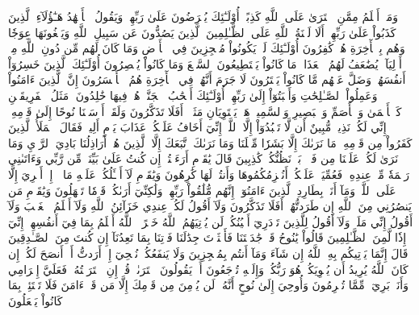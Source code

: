 وَمَنۡ أَظۡلَمُ مِمَّنِ ٱفۡتَرَىٰ عَلَى ٱللَّهِ كَذِبًاۚ أُوْلَـٰٓئِكَ يُعۡرَضُونَ عَلَىٰ رَبِّهِمۡ وَيَقُولُ ٱلۡأَشۡهَٰدُ هَـٰٓؤُلَآءِ ٱلَّذِينَ كَذَبُواْ عَلَىٰ رَبِّهِمۡۚ أَلَا لَعۡنَةُ ٱللَّهِ عَلَى ٱلظَّـٰلِمِينَ
ٱلَّذِينَ يَصُدُّونَ عَن سَبِيلِ ٱللَّهِ وَيَبۡغُونَهَا عِوَجٗا وَهُم بِٱلۡأٓخِرَةِ هُمۡ كَٰفِرُونَ
أُوْلَـٰٓئِكَ لَمۡ يَكُونُواْ مُعۡجِزِينَ فِي ٱلۡأَرۡضِ وَمَا كَانَ لَهُم مِّن دُونِ ٱللَّهِ مِنۡ أَوۡلِيَآءَۘ يُضَٰعَفُ لَهُمُ ٱلۡعَذَابُۚ مَا كَانُواْ يَسۡتَطِيعُونَ ٱلسَّمۡعَ وَمَا كَانُواْ يُبۡصِرُونَ
أُوْلَـٰٓئِكَ ٱلَّذِينَ خَسِرُوٓاْ أَنفُسَهُمۡ وَضَلَّ عَنۡهُم مَّا كَانُواْ يَفۡتَرُونَ
لَا جَرَمَ أَنَّهُمۡ فِي ٱلۡأٓخِرَةِ هُمُ ٱلۡأَخۡسَرُونَ
إِنَّ ٱلَّذِينَ ءَامَنُواْ وَعَمِلُواْ ٱلصَّـٰلِحَٰتِ وَأَخۡبَتُوٓاْ إِلَىٰ رَبِّهِمۡ أُوْلَـٰٓئِكَ أَصۡحَٰبُ ٱلۡجَنَّةِۖ هُمۡ فِيهَا خَٰلِدُونَ
۞مَثَلُ ٱلۡفَرِيقَيۡنِ كَٱلۡأَعۡمَىٰ وَٱلۡأَصَمِّ وَٱلۡبَصِيرِ وَٱلسَّمِيعِۚ هَلۡ يَسۡتَوِيَانِ مَثَلًاۚ أَفَلَا تَذَكَّرُونَ
وَلَقَدۡ أَرۡسَلۡنَا نُوحًا إِلَىٰ قَوۡمِهِۦٓ إِنِّي لَكُمۡ نَذِيرٞ مُّبِينٌ
أَن لَّا تَعۡبُدُوٓاْ إِلَّا ٱللَّهَۖ إِنِّيٓ أَخَافُ عَلَيۡكُمۡ عَذَابَ يَوۡمٍ أَلِيمٖ
فَقَالَ ٱلۡمَلَأُ ٱلَّذِينَ كَفَرُواْ مِن قَوۡمِهِۦ مَا نَرَىٰكَ إِلَّا بَشَرٗا مِّثۡلَنَا وَمَا نَرَىٰكَ ٱتَّبَعَكَ إِلَّا ٱلَّذِينَ هُمۡ أَرَاذِلُنَا بَادِيَ ٱلرَّأۡيِ وَمَا نَرَىٰ لَكُمۡ عَلَيۡنَا مِن فَضۡلِۭ بَلۡ نَظُنُّكُمۡ كَٰذِبِينَ
قَالَ يَٰقَوۡمِ أَرَءَيۡتُمۡ إِن كُنتُ عَلَىٰ بَيِّنَةٖ مِّن رَّبِّي وَءَاتَىٰنِي رَحۡمَةٗ مِّنۡ عِندِهِۦ فَعُمِّيَتۡ عَلَيۡكُمۡ أَنُلۡزِمُكُمُوهَا وَأَنتُمۡ لَهَا كَٰرِهُونَ
وَيَٰقَوۡمِ لَآ أَسۡـَٔلُكُمۡ عَلَيۡهِ مَالًاۖ إِنۡ أَجۡرِيَ إِلَّا عَلَى ٱللَّهِۚ وَمَآ أَنَا۠ بِطَارِدِ ٱلَّذِينَ ءَامَنُوٓاْۚ إِنَّهُم مُّلَٰقُواْ رَبِّهِمۡ وَلَٰكِنِّيٓ أَرَىٰكُمۡ قَوۡمٗا تَجۡهَلُونَ
وَيَٰقَوۡمِ مَن يَنصُرُنِي مِنَ ٱللَّهِ إِن طَرَدتُّهُمۡۚ أَفَلَا تَذَكَّرُونَ
وَلَآ أَقُولُ لَكُمۡ عِندِي خَزَآئِنُ ٱللَّهِ وَلَآ أَعۡلَمُ ٱلۡغَيۡبَ وَلَآ أَقُولُ إِنِّي مَلَكٞ وَلَآ أَقُولُ لِلَّذِينَ تَزۡدَرِيٓ أَعۡيُنُكُمۡ لَن يُؤۡتِيَهُمُ ٱللَّهُ خَيۡرًاۖ ٱللَّهُ أَعۡلَمُ بِمَا فِيٓ أَنفُسِهِمۡ إِنِّيٓ إِذٗا لَّمِنَ ٱلظَّـٰلِمِينَ
قَالُواْ يَٰنُوحُ قَدۡ جَٰدَلۡتَنَا فَأَكۡثَرۡتَ جِدَٰلَنَا فَأۡتِنَا بِمَا تَعِدُنَآ إِن كُنتَ مِنَ ٱلصَّـٰدِقِينَ
قَالَ إِنَّمَا يَأۡتِيكُم بِهِ ٱللَّهُ إِن شَآءَ وَمَآ أَنتُم بِمُعۡجِزِينَ
وَلَا يَنفَعُكُمۡ نُصۡحِيٓ إِنۡ أَرَدتُّ أَنۡ أَنصَحَ لَكُمۡ إِن كَانَ ٱللَّهُ يُرِيدُ أَن يُغۡوِيَكُمۡۚ هُوَ رَبُّكُمۡ وَإِلَيۡهِ تُرۡجَعُونَ
أَمۡ يَقُولُونَ ٱفۡتَرَىٰهُۖ قُلۡ إِنِ ٱفۡتَرَيۡتُهُۥ فَعَلَيَّ إِجۡرَامِي وَأَنَا۠ بَرِيٓءٞ مِّمَّا تُجۡرِمُونَ
وَأُوحِيَ إِلَىٰ نُوحٍ أَنَّهُۥ لَن يُؤۡمِنَ مِن قَوۡمِكَ إِلَّا مَن قَدۡ ءَامَنَ فَلَا تَبۡتَئِسۡ بِمَا كَانُواْ يَفۡعَلُونَ
